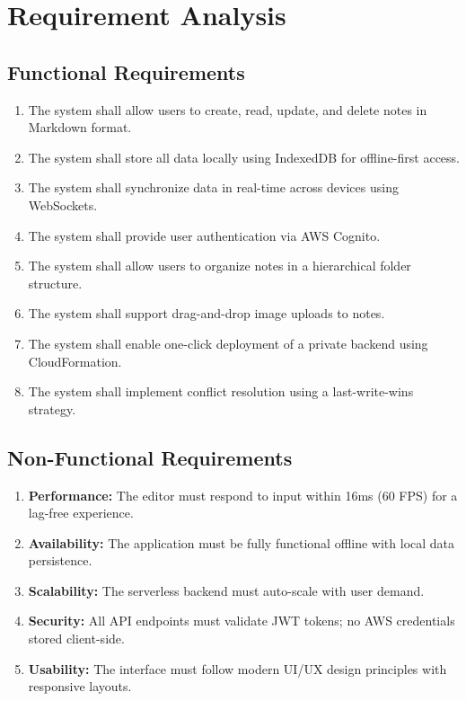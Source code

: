 \documentclass[12pt, a4paper, oneside]{report}
\begin{document}
\section{Requirement Analysis}

\subsection{Functional Requirements}
\begin{enumerate}
    \item The system shall allow users to create, read, update, and delete notes in Markdown format.
    \item The system shall store all data locally using IndexedDB for offline-first access.
    \item The system shall synchronize data in real-time across devices using WebSockets.
    \item The system shall provide user authentication via AWS Cognito.
    \item The system shall allow users to organize notes in a hierarchical folder structure.
    \item The system shall support drag-and-drop image uploads to notes.
    \item The system shall enable one-click deployment of a private backend using CloudFormation.
    \item The system shall implement conflict resolution using a last-write-wins strategy.
\end{enumerate}

\subsection{Non-Functional Requirements}
\begin{enumerate}
    \item \textbf{Performance:} The editor must respond to input within 16ms (60 FPS) for a lag-free experience.
    \item \textbf{Availability:} The application must be fully functional offline with local data persistence.
    \item \textbf{Scalability:} The serverless backend must auto-scale with user demand.
    \item \textbf{Security:} All API endpoints must validate JWT tokens; no AWS credentials stored client-side.
    \item \textbf{Usability:} The interface must follow modern UI/UX design principles with responsive layouts.
\end{enumerate}
\end{document}
